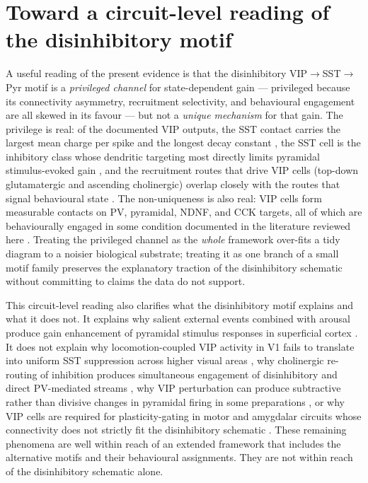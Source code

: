 \documentclass[11pt]{article}
\let\origrightarrow\rightarrow
\def\rightarrow{\ensuremath{\origrightarrow}}
\begin{document}
\section{Toward a circuit-level reading of the disinhibitory motif}

A useful reading of the present evidence is that the disinhibitory VIP\rightarrow SST\rightarrow Pyr motif is a \textit{privileged channel} for state-dependent gain --- privileged because its connectivity asymmetry, recruitment selectivity, and behavioural engagement are all skewed in its favour --- but not a \textit{unique mechanism} for that gain. The privilege is real: of the documented VIP outputs, the SST contact carries the largest mean charge per spike and the longest decay constant \citep{Pfeffer2013, Pi2013, Lee2013}, the SST cell is the inhibitory class whose dendritic targeting most directly limits pyramidal stimulus-evoked gain \citep{Pfeffer2013, Karnani2016a, Veit2023}, and the recruitment routes that drive VIP cells (top-down glutamatergic and ascending cholinergic) overlap closely with the routes that signal behavioural state \citep{Lee2013, Fu2014, Hangya2015, Pinto2015, Kamigaki2017, Williams2019}. The non-uniqueness is also real: VIP cells form measurable contacts on PV, pyramidal, NDNF, and CCK targets, all of which are behaviourally engaged in some condition documented in the literature reviewed here \citep{Karnani2016a, Karnani2016b, Anastasiades2021a, Schneidermizell2025, Veit2023}. Treating the privileged channel as the \textit{whole} framework over-fits a tidy diagram to a noisier biological substrate; treating it as one branch of a small motif family preserves the explanatory traction of the disinhibitory schematic without committing to claims the data do not support.

This circuit-level reading also clarifies what the disinhibitory motif explains and what it does not. It explains why salient external events combined with arousal produce gain enhancement of pyramidal stimulus responses in superficial cortex \citep{Lee2013, Fu2014, Zhang2014, Pinto2015, Williams2019, Veit2023}. It does not explain why locomotion-coupled VIP activity in V1 fails to translate into uniform SST suppression across higher visual areas \citep{Pakan2016, Garrett2020, Dipoppa2018}, why cholinergic re-routing of inhibition produces simultaneous engagement of disinhibitory and direct PV-mediated streams \citep{Kuchibhotla2017}, why VIP perturbation can produce subtractive rather than divisive changes in pyramidal firing in some preparations \citep{Hertag2019, Garciadelmolino2017}, or why VIP cells are required for plasticity-gating in motor and amygdalar circuits whose connectivity does not strictly fit the disinhibitory schematic \citep{Cichon2017, Krabbe2019, Tamboli2024}. These remaining phenomena are well within reach of an extended framework that includes the alternative motifs and their behavioural assignments. They are not within reach of the disinhibitory schematic alone.
\end{document}
